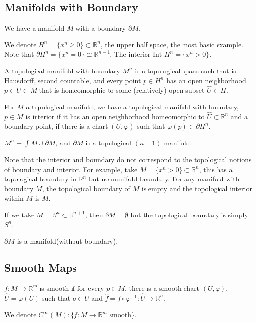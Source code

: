 \documentclass[12pt]{scrartcl}
\newcommand{\R}{\mathbb{R}}
\renewcommand{\hat}{\widehat}
\let \phi \varphi
\begin{document}
\subsection{Manifolds with Boundary}
We have a manifold $M$ with a boundary $\partial M$.  

We denote $H^n = \{x^n \ge 0\} \subset \R^n$, the upper half space, the most basic example.  Note that $\partial H^n = \{x^n = 0\} \cong \R^{n-1}$.  The interior $\text{Int }H^n = \{x^n > 0\}$.  
\begin{definition} A topological manifold with boundary $M^n$ is a topological space such that is Hausdorff,
 second countable, and every point $p \in H^n$ has an open neighborhood $p \in U \subset M$ that is
  homeomorphic to some (relatively) open subset $\hat{U} \subset H$.
\end{definition}

\begin{remark} For $M$ a topological manifold, we have a topological manifold with boundary, $p \in M$ is interior if it has an open neighborhood homeomorphic to $\hat{U} \subset \R^n$ and a boundary point, if there is a chart $(U, \phi)$ such that $\phi(p) \in \partial H^n$.
\end{remark}
\begin{theorem} $M^n = \int M \cup \partial M$, and $\partial M$ is a topological $(n-1)$ manifold.
\end{theorem}
Note that the interior and boundary do not correspond to the topological notions of boundary and interior.  For example, take $M = \{x^n > 0\} \subset \R^n$, this has a topological boundary in $\R^n$ but no manifold boundary.  For any manifold with boundary $M$, the topological boundary of $M$ is empty and the topological interior within $M$ is $M$.

If we take $M = S^n \subset \R^{n+1}$, then $\partial M = \emptyset$ but the topological boundary is simply $S^n$.

\begin{remark} $\partial M$ is a manifold(without boundary).
\end{remark}

\subsection{Smooth Maps}
\begin{definition} $f: M \to \R^m$ is smooth if for every $p \in M$, there is a smooth chart $(U, \phi)$, $\hat{U} = \phi(U)$ such that $p \in U$ and $\hat{f} = f \circ \phi^{-1}: \hat{U} \to \R^n$. 
\end{definition}
We denote $C^\infty(M) : \{f: M \to \R^m \text{ smooth}\}$.
\end{document}
